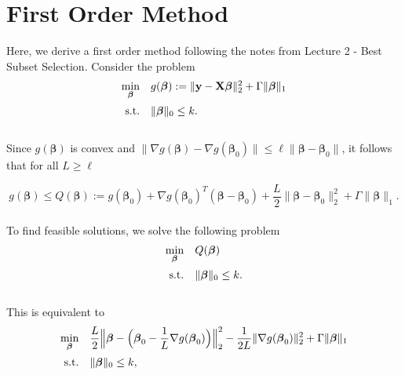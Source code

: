\documentclass[12pt]{article}
\newcommand{\M}{\mathbf}
\newcommand{\MS}{\boldsymbol}
\newcommand{\1}{\mathds{1}}
\begin{document}
\section{First Order Method}

Here, we derive a first order method following the notes from Lecture 2 - Best Subset Selection.  Consider the problem
\begin{equation}
\begin{array}{rll}
  \min \limits_{\MS \beta} & g(\MS \beta) := \|\M y - \M X \MS \beta \|_2^2 + \Gamma \| \MS \beta \|_1 \vspace{5pt}\\
  \text{s.t.} & \| \MS \beta \|_0 \le k.
\end{array}
\end{equation}\\

Since $g(\MS \beta)$ is convex and $\|\nabla g(\MS \beta) - \nabla g(\MS \beta_0)\| \le \ell \| \MS \beta - \MS \beta_0\|$, it follows that for all $L \ge \ell$

\begin{equation}
g(\MS \beta) \le Q(\MS \beta) := g(\MS \beta_0) + \nabla g(\MS \beta_0)^T(\MS \beta - \MS \beta_0) + \frac{L}{2} \|\MS \beta - \MS \beta_0\|_2^2 + \Gamma \| \MS \beta \|_1.
\end{equation}\\

To find feasible solutions, we solve the following problem
\begin{equation}
\begin{array}{rll}
  \min \limits_{\MS \beta} & Q(\MS \beta) \vspace{5pt}\\
  \text{s.t.} & \| \MS \beta \|_0 \le k.
\end{array}
\end{equation}\\

This is equivalent to
\begin{equation}
\begin{array}{rll}
  \min \limits_{\MS \beta} & \displaystyle \frac{L}{2}\Big\|\MS \beta - \Big(\MS \beta_0 - \frac{1}{L} \nabla g(\MS \beta_0)\Big) \Big\|_2^2 - \frac{1}{2L} \|\nabla g(\MS \beta_0) \|_2^2 + \Gamma \| \MS \beta \|_1 \vspace{5pt}\\
  \text{s.t.} & \| \MS \beta \|_0 \le k,
\end{array}
\end{equation}\\
\end{document}
